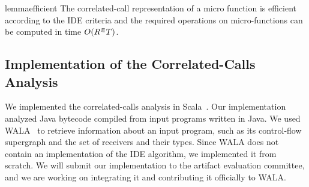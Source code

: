 \begin{restatable}{lemma}{efficient}\label{lem:efficient}
  The correlated-call representation of a micro function is efficient according to the IDE criteria and the required operations
  on micro-functions can be computed in time $O({R^\Subset} T)$.
\end{restatable}


\subsection{Implementation of the Correlated-Calls Analysis}
We implemented the correlated-calls analysis in Scala~\cite{odersky2004overview}. 
Our implementation analyzed Java bytecode compiled from input programs written
in Java.
We used WALA~\cite{fink2012wala}
to retrieve information about an input program, such as its control-flow supergraph and the set of receivers and their types.
Since WALA does not contain an implementation of the IDE algorithm,
we implemented it from scratch.
We will submit our implementation to the artifact evaluation committee, and we are working on integrating it and contributing it officially to WALA. %

